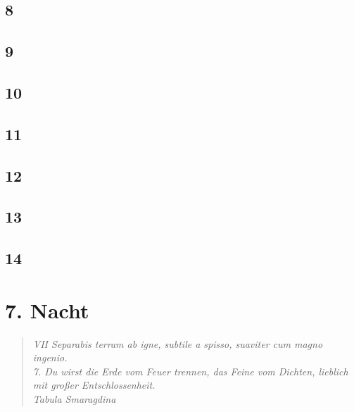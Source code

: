 \section*{8}

\section*{9}

\section*{10}

\section*{11}

\section*{12}

\section*{13}

\section*{14}



\chapter*{7. Nacht}



\begin{quotation}

\emph{VII Separabis terram ab igne, subtile a spisso, suaviter cum magno ingenio.\\7. Du wirst die Erde vom Feuer trennen, das Feine vom Dichten, lieblich mit großer Entschlossenheit.  \\Tabula Smaragdina}

\end{quotation}


